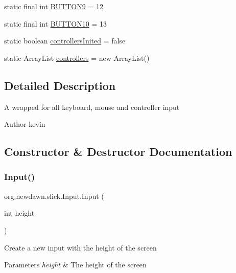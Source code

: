 \begin{DoxyCompactItemize}
static final int \mbox{\hyperlink{classorg_1_1newdawn_1_1slick_1_1_input_a3944e0bf181f06209c0bda3d85667feb}{B\+U\+T\+T\+O\+N9}} = 12
\item 
static final int \mbox{\hyperlink{classorg_1_1newdawn_1_1slick_1_1_input_a7a5f71e1b60654d0c9eadedd41b25810}{B\+U\+T\+T\+O\+N10}} = 13
\item 
static boolean \mbox{\hyperlink{classorg_1_1newdawn_1_1slick_1_1_input_ae782bdb973c10fd66f1d71dee393e506}{controllers\+Inited}} = false
\item 
static Array\+List \mbox{\hyperlink{classorg_1_1newdawn_1_1slick_1_1_input_a1bcc91bf0db9efc578bd934a8ed9ce67}{controllers}} = new Array\+List()
\end{DoxyCompactItemize}


\subsection{Detailed Description}
A wrapped for all keyboard, mouse and controller input

\begin{DoxyAuthor}{Author}
kevin 
\end{DoxyAuthor}


\subsection{Constructor \& Destructor Documentation}
\mbox{\label{classorg_1_1newdawn_1_1slick_1_1_input_a3ca3a9486b30fbe69a900c75d3a47c4d}} 
\subsubsection{\texorpdfstring{Input()}{Input()}}
{\footnotesize\ttfamily org.\+newdawn.\+slick.\+Input.\+Input (\begin{DoxyParamCaption}\item[{int}]{height }\end{DoxyParamCaption})\hspace{0.3cm}{\ttfamily [inline]}}

Create a new input with the height of the screen


\begin{DoxyParams}{Parameters}
{\em height} & The height of the screen \\
\hline
\end{DoxyParams}

